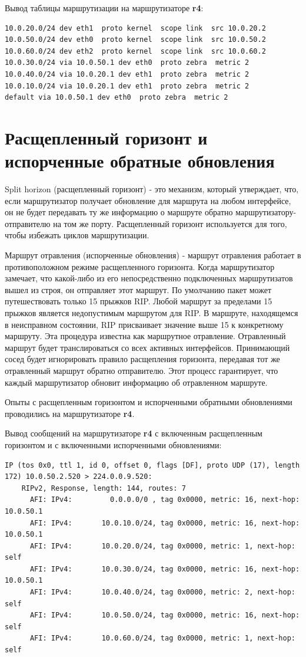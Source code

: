 \documentclass[a4paper,12pt]{article}
\begin{document}
Вывод таблицы маршрутизации на маршрутизаторе \textbf{r4}:

\begin{Verbatim}
10.0.20.0/24 dev eth1  proto kernel  scope link  src 10.0.20.2 
10.0.50.0/24 dev eth0  proto kernel  scope link  src 10.0.50.2 
10.0.60.0/24 dev eth2  proto kernel  scope link  src 10.0.60.2 
10.0.30.0/24 via 10.0.50.1 dev eth0  proto zebra  metric 2 
10.0.40.0/24 via 10.0.20.1 dev eth1  proto zebra  metric 2 
10.0.10.0/24 via 10.0.20.1 dev eth1  proto zebra  metric 2 
default via 10.0.50.1 dev eth0  proto zebra  metric 2
\end{Verbatim}

\section{Расщепленный горизонт и испорченные обратные обновления}

Split horizon (расщепленный горизонт) - это механизм, который утверждает, что, если маршрутизатор получает обновление для маршрута на любом интерфейсе, он не будет передавать ту же информацию о маршруте обратно маршрутизатору-отправителю на том же порту. Расщепленный горизонт используется для того, чтобы избежать циклов маршрутизации.

Маршрут отравления (испорченные обновления) - маршрут отравления работает в противоположном режиме расщепленного горизонта. Когда маршрутизатор замечает, что какой-либо из его непосредственно подключенных маршрутизатов вышел из строя, он отправляет этот маршрут. По умолчанию пакет может путешествовать только 15 прыжков RIP. Любой маршрут за пределами 15 прыжков является недопустимым маршрутом для RIP. В маршруте, находящемся в неисправном состоянии, RIP присваивает значение выше 15 к конкретному маршруту. Эта процедура известна как маршрутное отравление. Отравленный маршрут будет транслироваться со всех активных интерфейсов. Принимающий сосед будет игнорировать правило расщепления горизонта, передавая тот же отравленный маршрут обратно отправителю. Этот процесс гарантирует, что каждый маршрутизатор обновит информацию об отравленном маршруте.

Опыты с расщепленным горизонтом и испорченными обратными обновлениями проводились на маршрутизаторе \textbf{r4}.

Вывод сообщений на маршрутизаторе \textbf{r4} с включенным расщепленным горизонтом и с включенными испорченными обновлениями:

\begin{Verbatim}
IP (tos 0x0, ttl 1, id 0, offset 0, flags [DF], proto UDP (17), length 172) 10.0.50.2.520 > 224.0.0.9.520: 
	RIPv2, Response, length: 144, routes: 7
	  AFI: IPv4:         0.0.0.0/0 , tag 0x0000, metric: 16, next-hop: 10.0.50.1
	  AFI: IPv4:       10.0.10.0/24, tag 0x0000, metric: 16, next-hop: 10.0.50.1
	  AFI: IPv4:       10.0.20.0/24, tag 0x0000, metric: 1, next-hop: self
	  AFI: IPv4:       10.0.30.0/24, tag 0x0000, metric: 16, next-hop: 10.0.50.1
	  AFI: IPv4:       10.0.40.0/24, tag 0x0000, metric: 2, next-hop: self
	  AFI: IPv4:       10.0.50.0/24, tag 0x0000, metric: 16, next-hop: self
	  AFI: IPv4:       10.0.60.0/24, tag 0x0000, metric: 1, next-hop: self
\end{Verbatim}
\end{document}
